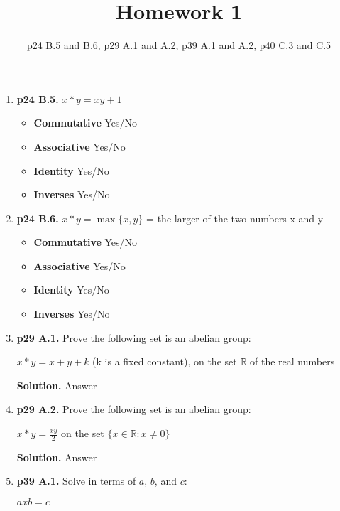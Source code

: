 \documentclass[11pt]{article}
\begin{document}
\title{Homework 1}
\date{p24 B.5 and B.6, p29 A.1 and A.2, p39 A.1 and A.2, p40 C.3 and C.5}
\maketitle

\thispagestyle{fancy}  
\pagestyle{fancy}      

\begin{enumerate}

\item {\bfseries p24 B.5.}
  $x*y = xy + 1$
  \begin{itemize}
  \item {\bfseries Commutative} Yes/No
  \item {\bfseries Associative} Yes/No
  \item {\bfseries Identity} Yes/No
  \item {\bfseries Inverses} Yes/No
  \end{itemize} 
 
\item {\bfseries p24 B.6.}
  $x*y = \max\{x,y\}$ = the larger of the two numbers x and y
  \begin{itemize}
  \item {\bfseries Commutative} Yes/No
  \item {\bfseries Associative} Yes/No
  \item {\bfseries Identity} Yes/No
  \item {\bfseries Inverses} Yes/No
  \end{itemize} 
 
\item {\bfseries p29 A.1.}
  Prove the following set is an abelian group:
  
  $x*y = x + y + k$ (k is a fixed constant), on the set $\mathbb{R}$ of the real numbers
  
  {\bfseries Solution.}
  Answer
 
\item {\bfseries p29 A.2.}
  Prove the following set is an abelian group:
  
  $x*y = \frac{xy}{2}$ on the set $\{x \in \mathbb{R} : x \neq 0\}$
  
  {\bfseries Solution.}
  Answer
 
\item {\bfseries p39 A.1.}
  Solve in terms of $a$, $b$, and $c$:
  
  $axb = c$
  

\end{enumerate}
\end{document}
